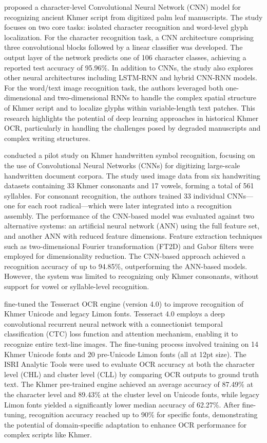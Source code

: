 \citet{Valy_8563219} proposed a character-level Convolutional Neural 
Network (CNN) model for recognizing ancient Khmer script from digitized 
palm leaf manuscripts. The study focuses on two core tasks: 
isolated character recognition and word-level glyph localization. 
For the character recognition task, a CNN architecture comprising 
three convolutional blocks followed by a linear classifier was 
developed. The output layer of the network predicts one of 106 
character classes, achieving a reported test accuracy of 95.96\%. 
In addition to CNNs, the study also explores other neural 
architectures including LSTM-RNN and hybrid CNN-RNN models. 
For the word/text image recognition task, the authors leveraged 
both one-dimensional and two-dimensional RNNs to handle the complex 
spatial structure of Khmer script and to localize glyphs within 
variable-length text patches. This research highlights the potential 
of deep learning approaches in historical Khmer OCR, particularly in 
handling the challenges posed by degraded manuscripts and complex 
writing structures.

\citet{Annanurov_2018} conducted a pilot study on Khmer handwritten 
symbol recognition, focusing on the use of Convolutional Neural 
Networks (CNNs) for digitizing large-scale handwritten document corpora. 
The study used image data from six handwriting datasets containing 
33 Khmer consonants and 17 vowels, forming a total of 561 syllables. 
For consonant recognition, the authors trained 33 individual CNNs—one 
for each root radical—which were later integrated into a recognition 
assembly. The performance of the CNN-based model was evaluated against 
two alternative systems: an artificial neural network (ANN) using the 
full feature set, and another ANN with reduced feature dimensions. 
Feature extraction techniques such as two-dimensional Fourier 
transformation (FT2D) and Gabor filters were employed for dimensionality 
reduction. The CNN-based approach achieved a recognition accuracy of 
up to 94.85\%, outperforming the ANN-based models. However, the system 
was limited to recognizing only Khmer consonants, without support for 
vowel or syllable-level recognition.

\citet{sokphyrum2019khmer} fine-tuned the Tesseract OCR engine 
(version 4.0) to improve recognition of Khmer Unicode and legacy 
Limon fonts. Tesseract 4.0 employs a deep convolutional recurrent 
neural network with a connectionist temporal classification (CTC) 
loss function and attention mechanism, enabling it to recognize entire 
text-line images. The fine-tuning process involved training on 14 Khmer 
Unicode fonts and 20 pre-Unicode Limon fonts (all at 12pt size). 
The ISRI Analytic Tools were used to evaluate OCR accuracy at both 
the character level (CHL) and cluster level (CLL) by comparing OCR 
outputs to ground truth text. The Khmer pre-trained engine achieved 
an average accuracy of 87.49\% at the character level and 89.43\% at 
the cluster level on Unicode fonts, while legacy Limon fonts yielded 
a significantly lower median accuracy of 62.27\%. After fine-tuning, 
recognition accuracy reached up to 90\% for specific fonts, demonstrating 
the potential of domain-specific adaptation to enhance OCR performance 
for complex scripts like Khmer.

